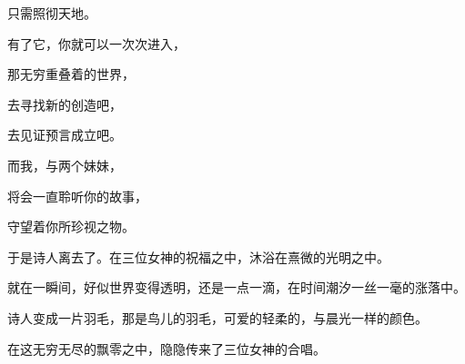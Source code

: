 \documentclass[UTF8]{article}
\begin{document}
\par 只需照彻天地。
\par 有了它，你就可以一次次进入，
\par 那无穷重叠着的世界，
\par 去寻找新的创造吧，
\par 去见证预言成立吧。
\par 而我，与两个妹妹，
\par 将会一直聆听你的故事，
\par 守望着你所珍视之物。
\\[0.6cm]
\par 于是诗人离去了。在三位女神的祝福之中，沐浴在熹微的光明之中。
\par 就在一瞬间，好似世界变得透明，还是一点一滴，在时间潮汐一丝一毫的涨落中。
\par 诗人变成一片羽毛，那是鸟儿的羽毛，可爱的轻柔的，与晨光一样的颜色。
\par 在这无穷无尽的飘零之中，隐隐传来了三位女神的合唱。
\end{document}
